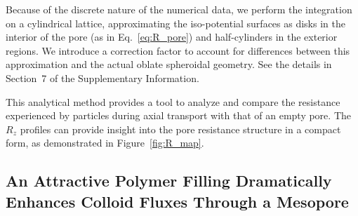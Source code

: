 \documentclass[12pt, a4paper]{article}
\begin{document}
Because of the discrete nature of the numerical data, we perform the integration on a cylindrical lattice, approximating the iso-potential surfaces as disks in the interior of the pore (as in Eq.~\ref{eq:R_pore}) and half-cylinders in the exterior regions.
We introduce a correction factor to account for differences between this approximation and the actual oblate spheroidal geometry.
See the details in Section~7 of the Supplementary Information.

This analytical method provides a tool to analyze and compare the resistance experienced by particles during axial transport with that of an empty pore.
The $R_z$ profiles can provide insight into the pore resistance structure in a compact form, as demonstrated in Figure~\ref{fig:R_map}.


\subsection{An Attractive Polymer Filling Dramatically Enhances Colloid Fluxes Through a Mesopore}
\end{document}

